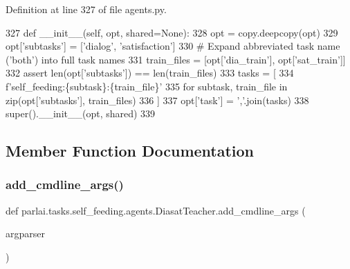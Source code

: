Definition at line 327 of file agents.\+py.


\begin{DoxyCode}
327     \textcolor{keyword}{def }\_\_init\_\_(self, opt, shared=None):
328         opt = copy.deepcopy(opt)
329         opt[\textcolor{stringliteral}{'subtasks'}] = [\textcolor{stringliteral}{'dialog'}, \textcolor{stringliteral}{'satisfaction'}]
330         \textcolor{comment}{# Expand abbreviated task name ('both') into full task names}
331         train\_files = [opt[\textcolor{stringliteral}{'dia\_train'}], opt[\textcolor{stringliteral}{'sat\_train'}]]
332         \textcolor{keyword}{assert} len(opt[\textcolor{stringliteral}{'subtasks'}]) == len(train\_files)
333         tasks = [
334             f\textcolor{stringliteral}{'self\_feeding:\{subtask\}:\{train\_file\}'}
335             \textcolor{keywordflow}{for} subtask, train\_file \textcolor{keywordflow}{in} zip(opt[\textcolor{stringliteral}{'subtasks'}], train\_files)
336         ]
337         opt[\textcolor{stringliteral}{'task'}] = \textcolor{stringliteral}{','}.join(tasks)
338         super().\_\_init\_\_(opt, shared)
339 
\end{DoxyCode}


\subsection{Member Function Documentation}
\mbox{\label{classparlai_1_1tasks_1_1self__feeding_1_1agents_1_1DiasatTeacher_a28eadfed974fe247525076406032e7ec}} 
\subsubsection{\texorpdfstring{add\+\_\+cmdline\+\_\+args()}{add\_cmdline\_args()}}
{\footnotesize\ttfamily def parlai.\+tasks.\+self\+\_\+feeding.\+agents.\+Diasat\+Teacher.\+add\+\_\+cmdline\+\_\+args (\begin{DoxyParamCaption}\item[{}]{argparser }\end{DoxyParamCaption})\hspace{0.3cm}{\ttfamily [static]}}



